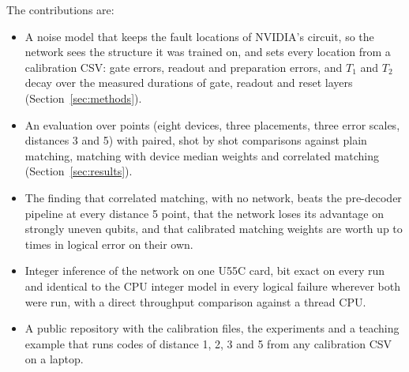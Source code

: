The contributions are:
\begin{itemize}
\item A noise model that keeps the fault locations of NVIDIA's circuit, so the network sees the structure it was
trained on, and sets every location from a calibration CSV: gate errors, readout and preparation errors, and $T_1$ and
$T_2$ decay over the measured durations of gate, readout and reset layers (Section~\ref{sec:methods}).
\item An evaluation over \NumPoints{} points (eight devices, three placements, three error scales, distances 3 and 5)
with paired, shot by shot comparisons against plain matching, matching with device median weights and correlated
matching \cite{fowler2013correlated,paler2023pipelined} (Section~\ref{sec:results}).
\item The finding that correlated matching, with no network, beats the pre-decoder pipeline at every distance 5
point, that the network loses its advantage on strongly uneven qubits, and that calibrated matching weights are worth
up to \MedWeightsMax{} times in logical error on their own.
\item Integer inference of the network on one U55C card, bit exact on every run and identical to the CPU integer
model in every logical failure wherever both were run, with a direct throughput comparison against a \CpuThreads{} thread CPU.
\item A public repository with the calibration files, the experiments and a teaching example that runs codes of
distance 1, 2, 3 and 5 from any calibration CSV on a laptop.
\end{itemize}
